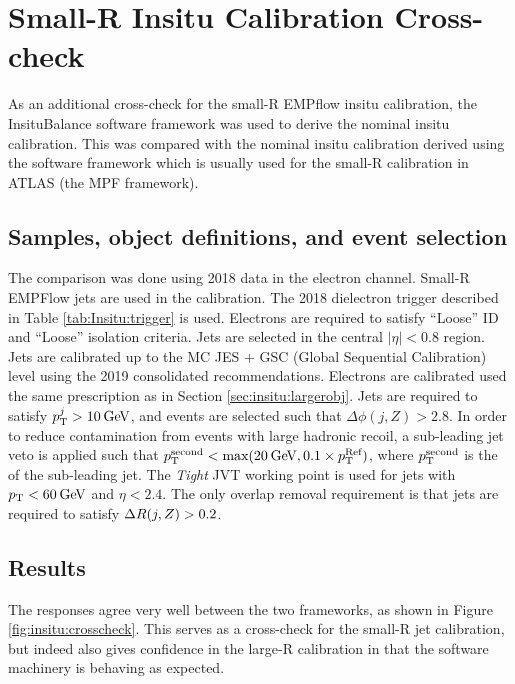 \section{Small-R Insitu Calibration Cross-check}
As an additional cross-check for the small-R EMPflow \zjets insitu calibration, the InsituBalance software framework was used to derive the nominal insitu calibration. This was compared with the nominal insitu calibration derived using the software framework which is usually used for the small-R calibration in ATLAS (the MPF framework). 

\subsection{Samples, object definitions, and event selection}

The comparison was done using 2018 data in the electron channel. Small-R EMPFlow jets are used in the calibration. The 2018 dielectron trigger described in Table \ref{tab:Insitu:trigger} is used. Electrons are required to satisfy ``Loose'' ID and ``Loose'' isolation criteria. Jets are selected in the central $|\eta|<0.8$ region. Jets are calibrated up to the MC JES + GSC (Global Sequential Calibration) level using the 2019 consolidated recommendations. Electrons are calibrated used the same prescription as in Section \ref{sec:insitu:largerobj}. Jets are required to satisfy $p_{\text{T}}^j>10\hspace{2pt}\text{Ge\kern -0.1em V}$, and events are selected such that $\Delta\phi(j,Z)>2.8$. In order to reduce contamination from events with large hadronic recoil, a sub-leading jet veto is applied such that $p_{\text{T}}^{\text{second}}<\text{max}(20\hspace{2pt}\text{Ge\kern -0.1em V},0.1\times p_{\text{T}}^{\text{Ref}})$, where $p_{\text{T}}^{\text{second}}$ is the \pt of the sub-leading jet. The \textit{Tight} JVT working point is used for jets with $p_{\text{T}}<60\hspace{2pt}\text{Ge\kern -0.1em V}$ and $\eta<2.4$. The only overlap removal requirement is that jets are required to satisfy $\Delta R(j,Z)>0.2$.

\subsection{Results}

The responses agree very well between the two frameworks, as shown in Figure \ref{fig:insitu:crosscheck}. This serves as a cross-check for the small-R jet calibration, but indeed also gives confidence in the large-R calibration in that the software machinery is behaving as expected.

